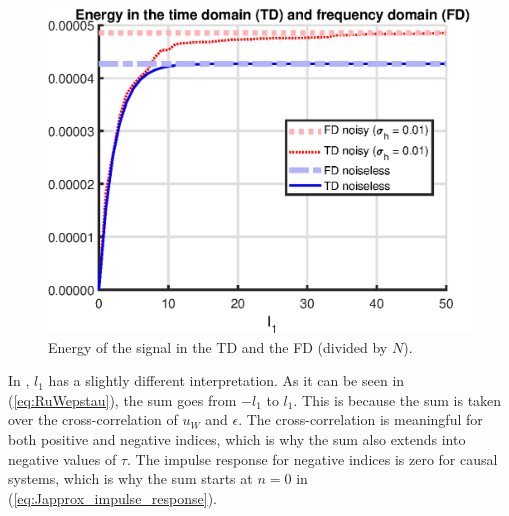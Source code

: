 \begin{figure}[H]
    \centering
    \includegraphics[width = 0.65 \textwidth]{figures/parseval_energy.eps}
    \caption{Energy of the signal in the TD and the FD (divided by $N$).}
    \label{fig:parseval_energy}
\end{figure}

In \cite{Data-driven_model_reference_control}, $l_1$ has a slightly different interpretation. As it can be seen in (\ref{eq:RuWepstau}), the sum goes from $-l_1$ to $l_1$. This is because the sum is taken over the cross-correlation of $u_W$ and $\epsilon$. The cross-correlation is meaningful for both positive and negative indices, which is why the sum also extends into negative values of $\tau$. The impulse response for negative indices is zero for causal systems, which is why the sum starts at $n = 0$ in (\ref{eq:Japprox_impulse_response}).

\newpage

